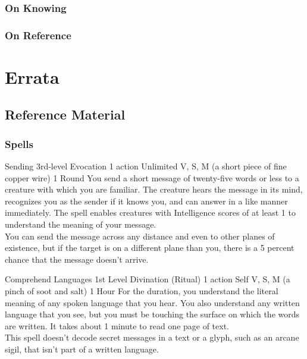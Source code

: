 \documentclass[10pt,twoside,twocolumn,openany,nomultitoc]{book}
\begin{document}
\section{On Knowing}
    \lipsum[2]
\section{On Reference}
    \lipsum[3]
    
\part{Errata}
\chapter{Reference Material}

\section{Spells}\vspace{6pt}

    \DndSpellHeader%
      {Sending}
      {3rd-level Evocation}
      {1 action}
      {Unlimited}
      {V, S, M (a short piece of fine copper wire)}
      {1 Round}
            You send a short message of twenty-five words or less to a creature with which you are familiar. The creature hears the message in its mind, recognizes you as the sender if it knows you, and can answer in a like manner immediately. The spell enables creatures with Intelligence scores of at least 1 to understand the meaning of your message. \\
            You can send the message across any distance and even to other planes of existence, but if the target is on a different plane than you, there is a 5 percent chance that the message doesn't arrive.
        
    \DndSpellHeader%
      {Comprehend Languages}
      {1st Level Divination (Ritual)}
      {1 action}
      {Self}
      {V, S, M (a pinch of soot and salt)}
      {1 Hour}
    For the duration, you understand the literal meaning of any spoken language that you hear. You also understand any written language that you see, but you must be touching the surface on which the words are written. It takes about 1 minute to read one page of text. \\
    This spell doesn’t decode secret messages in a text or a glyph, such as an arcane sigil, that isn’t part of a written language.        
    
\end{document}
